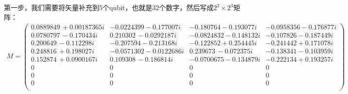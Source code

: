 第一步，我们需要将矢量补充到5个qubit，也就是32个数字，然后写成$2^2 \times 2^3$矩阵：
\begin{equation}
\begin{split}
    M=
\left(
\begin{array}{cccc}
 0.0889849\, +0.00187365 i & -0.0224399-0.177007 i & -0.180764-0.193077 i & -0.0958356-0.176877 i \\
 0.0780797\, -0.170434 i & 0.210302\, -0.0292187 i & -0.0824832-0.148132 i & -0.107826-0.187449 i \\
 0.200649\, -0.112298 i & -0.207594-0.213168 i & -0.122852+0.254445 i & -0.241442+0.171078 i \\
 0.248816\, +0.198027 i & -0.0571302-0.0122686 i & 0.239673\, -0.072375 i & -0.138341-0.103959 i \\
 0.152874\, +0.0900167 i & 0.109308\, -0.186814 i & -0.0700675-0.134879 i & -0.222134+0.193257 i \\
 0 & 0 & 0 & 0 \\
 0 & 0 & 0 & 0 \\
 0 & 0 & 0 & 0 \\
\end{array}
\right)
\end{split}
\end{equation}


